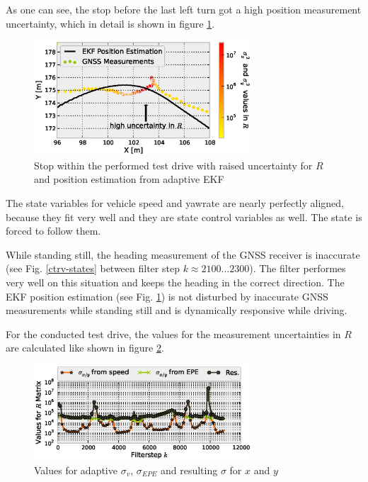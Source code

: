 \documentclass[conference]{IEEEtran}
\begin{document}
As one can see, the stop before the last left turn got a high position measurement uncertainty, which in detail is shown in figure \ref{ctrv-position-detail}.

\begin{figure}[ht]
\centering
\includegraphics[width=3.2in]{images/Extended-Kalman-Filter-CTRV-Position-Detail}
\caption{Stop within the performed test drive with raised uncertainty for $R$ and position estimation from adaptive EKF}
\label{ctrv-position-detail}
\end{figure}


The state variables for vehicle speed and yawrate are nearly perfectly aligned, because they fit very well and they are state control variables as well. The state is forced to follow them.

While standing still, the heading measurement of the GNSS receiver is inaccurate (see Fig. \ref{ctrv-states} between filter step $k\approx2100\dotsc2300$). The filter performes very well on this situation and keeps the heading in the correct direction. The EKF position estimation (see Fig. \ref{ctrv-position-detail}) is not disturbed by inaccurate GNSS measurements while standing still and is dynamically responsive while driving. 

For the conducted test drive, the values for the measurement uncertainties in $R$ are calculated like shown in figure \ref{adaptive-R}.

\begin{figure}[ht]
\centering
\includegraphics[width=3.2in]{images/Extended-Kalman-Filter-CTRV-Adaptive-R}
\caption{Values for adaptive $\sigma_v$, $\sigma_{EPE}$ and resulting $\sigma$ for $x$ and $y$}
\label{adaptive-R}
\end{figure}
\end{document}
